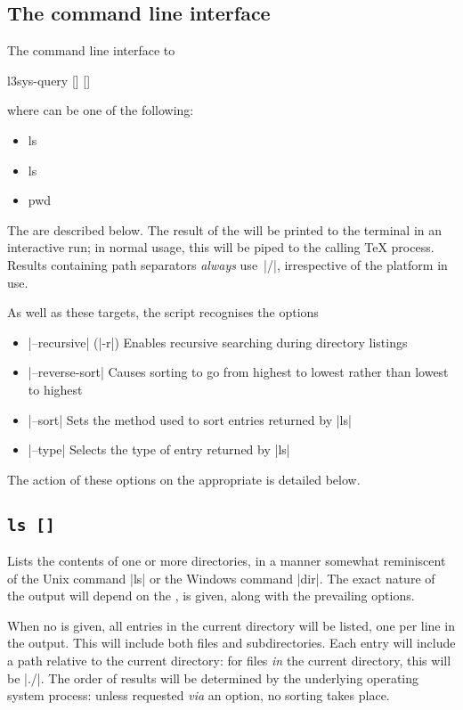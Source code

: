 \documentclass{l3doc}
\begin{document}
\begin{documentation}
\section{The command line interface}

The command line interface to 
\begin{center}
  \ttfamily
  l3sys-query  [] []
\end{center}
where \texttt{} can be one of the following:
\begin{itemize}[noitemsep]\ttfamily
  \item ls
  \item ls 
  \item pwd
\end{itemize}
The  are described below. The result of the  will be
printed to the terminal in an interactive run; in normal usage, this will be
piped to the calling \TeX{} process. Results containing path separators
\emph{always} use~|/|, irrespective of the platform in use.

As well as these targets, the script recognises the options
\begin{itemize}
  \item |--recursive| (|-r|) Enables recursive searching during directory
    listings
  \item |--reverse-sort| Causes sorting to go from highest to lowest rather
    than lowest to highest
  \item |--sort| Sets the method used to sort entries returned by |ls|
  \item |--type| Selects the type of entry returned by |ls|
\end{itemize}
The action of these options on the appropriate  is detailed below.

\subsection{\texttt{ls []}}

Lists the contents of one or more directories, in a manner somewhat reminiscent
of the Unix command |ls| or the Windows command |dir|. The exact nature of the
output will depend on the , is given, along with the prevailing
options.

When no  is given, all entries in the current directory will be
listed, one per line in the output. This will include both files and
subdirectories. Each entry will include a path relative to the current
directory: for files \emph{in} the current directory, this will be |./|. The
order of results will be determined by the underlying operating system process:
unless requested \emph{via} an option, no sorting takes place.


\end{documentation}
\end{document}
